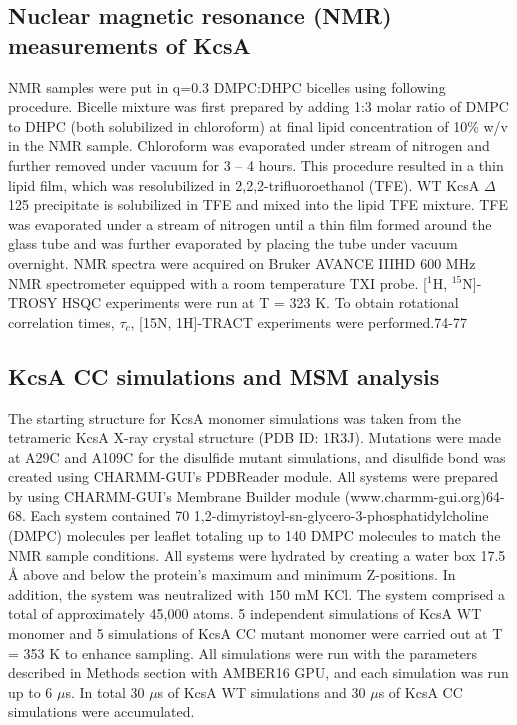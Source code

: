 \subsection{Nuclear magnetic resonance (NMR) measurements of KcsA}
NMR samples were put in q=0.3 DMPC:DHPC bicelles using following procedure. Bicelle mixture was first prepared by adding 1:3 molar ratio of DMPC to DHPC (both solubilized in chloroform) at final lipid concentration of 10\% w/v in the NMR sample. Chloroform was evaporated under stream of nitrogen and further removed under vacuum for 3 – 4 hours. This procedure resulted in a thin lipid film, which was resolubilized in 2,2,2-trifluoroethanol (TFE). WT KcsA $\Delta$125 precipitate is solubilized in TFE and mixed into the lipid TFE mixture. TFE was evaporated under a stream of nitrogen until a thin film formed around the glass tube and was further evaporated by placing the tube under vacuum overnight. NMR spectra were acquired on Bruker AVANCE IIIHD 600 MHz NMR spectrometer equipped with a room temperature TXI probe. [$^{1}$H, $^{15}$N]-TROSY HSQC experiments were run at T = 323 K. To obtain rotational correlation times, $\tau_{c}$, [15N, 1H]-TRACT experiments were performed.74-77 

\subsection{KcsA CC simulations and MSM analysis}
The starting structure for KcsA monomer simulations was taken from the tetrameric KcsA X-ray crystal structure (PDB ID: 1R3J). Mutations were made at A29C and A109C for the disulfide mutant simulations, and disulfide bond was created using CHARMM-GUI’s PDBReader module. All systems were prepared by using CHARMM-GUI’s Membrane Builder module (www.charmm-gui.org)64-68. Each system contained 70 1,2-dimyristoyl-sn-glycero-3-phosphatidylcholine (DMPC) molecules per leaflet totaling up to 140 DMPC molecules to match the NMR sample conditions. All systems were hydrated by creating a water box 17.5 Å above and below the protein’s maximum and minimum Z-positions. In addition, the system was neutralized with 150 mM KCl. The system comprised a total of approximately 45,000 atoms. 5 independent simulations of KcsA WT monomer and 5 simulations of KcsA CC mutant monomer were carried out at T = 353 K to enhance sampling. All simulations were run with the parameters described in Methods section with AMBER16 GPU, and each simulation was run up to 6 $\mu$s. In total 30 $\mu$s of KcsA WT simulations and 30 $\mu$s of KcsA CC simulations were accumulated.

